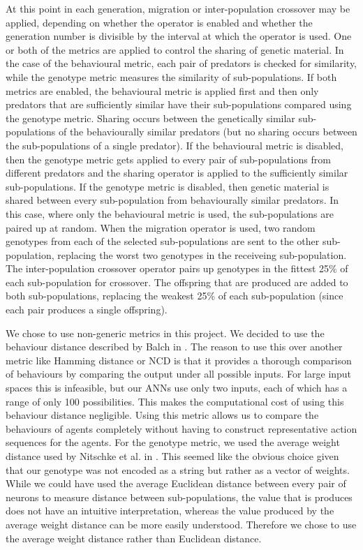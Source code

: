 \documentclass[12pt]{article} %
\begin{document}
At this point in each generation, migration or inter-population crossover may be applied, depending on whether the operator is enabled and whether the generation number is divisible by the interval at which the operator is used. One or both of the metrics are applied to control the sharing of genetic material. In the case of the behavioural metric, each pair of predators is checked for similarity, while the genotype metric measures the similarity of sub-populations. If both metrics are enabled, the behavioural metric is applied first and then only predators that are sufficiently similar have their sub-populations compared using the genotype metric. Sharing occurs between the genetically similar sub-populations of the behaviourally similar predators (but no sharing occurs between the sub-populations of a single predator). If the behavioural metric is disabled, then the genotype metric gets applied to every pair of sub-populations from different predators and the sharing operator is applied to the sufficiently similar sub-populations. If the genotype metric is disabled, then genetic material is shared between every sub-population from behaviourally similar predators. In this case, where only the behavioural metric is used, the sub-populations are paired up at random. When the migration operator is used, two random genotypes from each of the selected sub-populations are sent to the other sub-population, replacing the worst two genotypes in the receiveing sub-population. The inter-population crossover operator pairs up genotypes in the fittest 25\% of each sub-population for crossover. The offspring that are produced are added to both sub-populations, replacing the weakest 25\% of each sub-population (since each pair produces a single offspring).

We chose to use non-generic metrics in this project. We decided to use the behaviour distance described by Balch in \cite{Balch1997}. The reason to use this over another metric like Hamming distance or NCD is that it provides a thorough comparison of behaviours by comparing the output under all possible inputs. For large input spaces this is infeasible, but our ANNs use only two inputs, each of which has a range of only 100 possibilities. This makes the computational cost of using this behaviour distance negligible. Using this metric allows us to compare the behaviours of agents completely without having to construct representative action sequences for the agents. For the genotype metric, we used the average weight distance used by Nitschke et al. in \cite{Nitschke2010}. This seemed like the obvious choice given that our genotype was not encoded as a string but rather as a vector of weights. While we could have used the average Euclidean distance between every pair of neurons to measure distance between sub-populations, the value that is produces does not have an intuitive interpretation, whereas the value produced by the average weight distance can be more easily understood. Therefore we chose to use the average weight distance rather than Euclidean distance.
\end{document}
